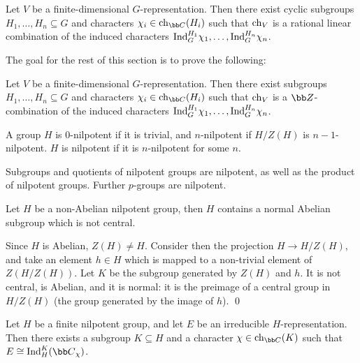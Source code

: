 \bthrm[title=Artin's induction theorem]

    Let $V$ be a finite-dimensional $G$-representation.
    Then there exist cyclic subgroups $H_1,\dots,H_n\subseteq G$ and characters $\chi_i\in\ch_\bC(H_i)$ such that ${\rm ch}_V$ is a rational
    linear combination of the induced characters ${\rm Ind}^{H_1}_G\chi_1,\dots,{\rm Ind}^{H_n}_G\chi_n$.

\ethrm

The goal for the rest of this section is to prove the following:

\bthrm[title=Brauer's induction theorem]

    Let $V$ be a finite-dimensional $G$-representation.
    Then there exist subgroups $H_1,\dots,H_n\subseteq G$ and characters $\chi_i\in\ch_\bC(H_i)$ such that ${\rm ch}_V$ is a $\bZ$-combination
    of the induced characters ${\rm Ind}^{H_1}_G\chi_1,\dots,{\rm Ind}^{H_n}_G\chi_n$.

\ethrm

\bdefn

    A group $H$ is {\emphcolor $0$-nilpotent} if it is trivial, and {\emphcolor $n$-nilpotent} if $H/Z(H)$ is $n-1$-nilpotent.
    $H$ is {\emphcolor nilpotent} if it is $n$-nilpotent for some $n$.

\edefn

Subgroups and quotients of nilpotent groups are nilpotent, as well as the product of nilpotent groups.
Further $p$-groups are nilpotent.

\blemm

    Let $H$ be a non-Abelian nilpotent group, then $H$ contains a normal Abelian subgroup which is not central.

\elemm

\bproof

    Since $H$ is Abelian, $Z(H)\neq H$.
    Consider then the projection $H\to H/Z(H)$, and take an element $h\in H$ which is mapped to a non-trivial element of $Z(H/Z(H))$.
    Let $K$ be the subgroup generated by $Z(H)$ and $h$.
    It is not central, is Abelian, and it is normal: it is the preimage of a central group in $H/Z(H)$ (the group generated by the image of $h$).
    \qed

\eproof

\blemm

    Let $H$ be a finite nilpotent group, and let $E$ be an irreducible $H$-representation.
    Then there exists a subgroup $K\subseteq H$ and a character $\chi\in\ch_\bC(K)$ such that $E\cong\Ind^K_H(\bC_\chi)$.

\elemm

